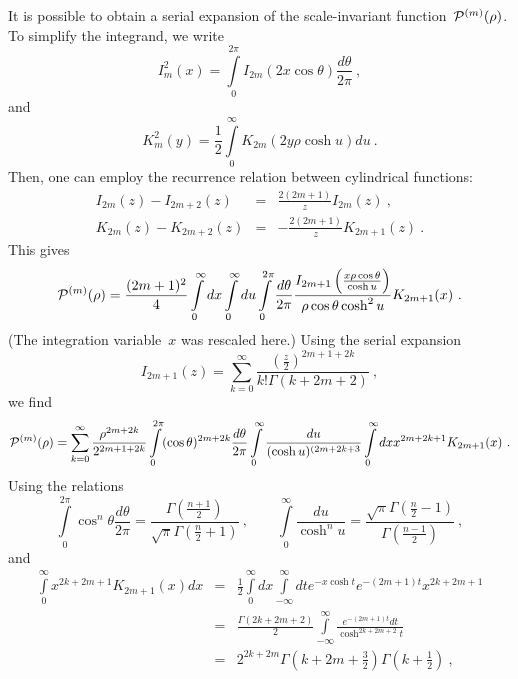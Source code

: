 \documentclass[preprint,aps,prb]{revtex4}
\begin{document}
It is possible to obtain a serial expansion of the scale-invariant
function~${\cal P}^{(m)}(\rho)$. To simplify the integrand, we write
\begin{equation}
I_m^2(x) = \int\limits_{0}^{2\pi} I_{2m} \left(2 x \cos\theta \right)
\frac{d\theta}{2\pi}
\ , 
\end{equation}
and
\begin{equation}
K_m^2(y) = \frac{1}{2}
\int\limits_0^{\infty} K_{2m}(2 y  \rho \cosh u) du
\ .
\end{equation}
Then, one can employ the recurrence relation between cylindrical
functions:
\begin{eqnarray}
I_{2m}(z) - I_{2m + 2}(z) &=& \frac{2(2m + 1)}{z} I_{2m}(z)
\ , \\
K_{2m}(z) - K_{2m + 2}(z) &=& - \frac{2(2m + 1)}{z} K_{2m + 1}(z)
\ .
\end{eqnarray}
This gives
\begin{equation}
{\cal P}^{(m)}(\rho) = \frac{(2m + 1)^2}{4}\int\limits_{0}^{\infty} dx
\int\limits_{0}^{\infty} du \int\limits_{0}^{2\pi} \frac{d\theta}{2\pi}
\frac{I_{2m + 1}\left(\frac{x \rho \cos \theta}{\cosh u}\right)}{\rho
\cos \theta \cosh^2 u}
K_{2m + 1} (x)
\ .
\end{equation}
(The integration variable~$x$ was rescaled here.) Using the serial expansion
\begin{equation}
I_{2m + 1}(z) = \sum_{k = 0}^{\infty} \frac{\left(\frac{z}{2}
\right)^{2m + 1 + 2k}}{k! \Gamma(k + 2m + 2)}
\ , 
\end{equation}
we find
\begin{equation}
{\cal P}^{(m)}(\rho) = 
\sum_{k = 0}^{\infty} \frac{\rho^{2m + 2k}}{2^{2m + 1  + 2k}} 
\int\limits_{0}^{2\pi} (\cos\theta)^{2m + 2k} \frac{d\theta}{2\pi}
\int\limits_{0}^{\infty} \frac{du}{(\cosh u)^{(2m + 2k + 3}} 
\int\limits_{0}^{\infty} dx x^{2m + 2k + 1} K_{2m + 1}(x)
\ .
\end{equation}
Using the relations
\begin{equation}
\int\limits_{0}^{2\pi} \cos^{n}\theta \frac{d\theta}{2\pi} 
= \frac{\Gamma\left(\frac{n + 1}{2}\right)}{
      \sqrt{\pi} \Gamma\left(\frac{n}{2} + 1\right)}
      \ , \qquad
\int\limits_{0}^{\infty} \frac{du}{\cosh^{n} u} = 
\frac{\sqrt{\pi} \Gamma\left(\frac{n}{2} - 1\right)}{ 
      \Gamma\left(\frac{n - 1}{2}\right)}
\ ,       
\end{equation}
and
\begin{eqnarray}
\int\limits_{0}^{\infty} x^{2k + 2m + 1} K_{2m + 1}(x) dx &=& \frac{1}{2}
\int\limits_{0}^{\infty}dx
\int\limits_{-\infty}^{\infty}dt e^{-x \cosh t} e^{-(2m + 1)t} x^{2k + 2m
+ 1}
\\
\nonumber
 &=& \frac{\Gamma(2k + 2m + 2)}{2} \int\limits_{-\infty}^{\infty}
 \frac{e^{-(2m + 1)t} dt}{\cosh^{2k + 2m + 2}t}  
\\
\nonumber
&=& 2^{2k + 2m}  
 \Gamma\left(k + 2m + \frac{3}{2}\right) \Gamma\left(k + \frac{1}{2}\right)
\ , 
\end{eqnarray}
\end{document}
